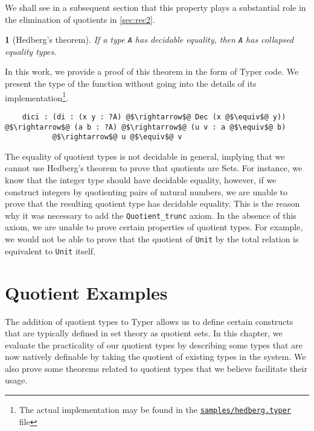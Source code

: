 \documentclass[12pt,twoside,maitrise]{dms}
\newtheorem{theo}[cor]{\theoremname}
\theoremstyle{definition}
\numberwithin{equation}{section}
\numberwithin{table}{chapter}
\numberwithin{figure}{chapter}
\newcommand\id[1] {\texttt{#1}}
\newcommand\fn[1] {\texttt{#1}}
\begin{document}
We shall see in a subsequent section that this property plays a substantial role
in the elimination of quotients in \autoref{sec:rec2}.

\begin{theo}[Hedberg's theorem\cite{hedberg1998coherence}]
If a type \fn{A} has decidable equality, then \fn{A} has collapsed equality
types.
\end{theo}

In this work, we provide a proof of this theorem in the form of Typer code. We
present the type of the function without going into the details of its
implementation\footnote{The actual implementation may be found in the
\href{https://gitlab.com/jamestjw/typer/-/blob/quot-types-v1.0.0/samples/hedberg.typer}{\id{samples/hedberg.typer}}
file}.

\begin{verbatim}
    dici : (di : (x y : ?A) @$\rightarrow$@ Dec (x @$\equiv$@ y)) @$\rightarrow$@ (a b : ?A) @$\rightarrow$@ (u v : a @$\equiv$@ b)
           @$\rightarrow$@ u @$\equiv$@ v
\end{verbatim}

The equality of quotient types is not decidable in general, implying that we
cannot use Hedberg's theorem to prove that quotients are Sets. For instance, we
know that the integer type should have decidable equality, however, if we
construct integers by quotienting pairs of natural numbers, we are unable to
prove that the resulting quotient type has decidable equality. This is the
reason why it was necessary to add the \id{Quotient\_trunc} axiom. In the
absence of this axiom, we are unable to prove certain properties of quotient
types. For example, we would not be able to prove that the quotient of \id{Unit}
by the total relation is equivalent to \id{Unit}
itself\cite{vezzosi2021cubical}.

\chapter{Quotient Examples}\label{ch:quot-examples}
The addition of quotient types to Typer allows us to define certain constructs
that are typically defined in set theory as quotient sets. In this chapter, we
evaluate the practicality of our quotient types by describing some types that
are now natively definable by taking the quotient of existing types in the
system. We also prove some theorems related to quotient types that we believe
facilitate their usage.
\end{document}
